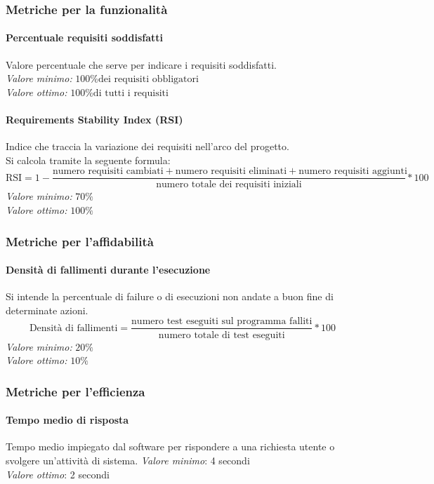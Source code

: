 \subsubsection{Metriche per la funzionalità}
\paragraph{Percentuale requisiti soddisfatti}
Valore percentuale che serve per indicare i requisiti soddisfatti.\\
\textit{Valore minimo:} $100\% \text{dei requisiti obbligatori}$\\
\textit{Valore ottimo:} $100\% \text{di tutti i requisiti}$
\paragraph{Requirements Stability Index (RSI)}
Indice che traccia la variazione dei requisiti nell'arco del progetto.\\
Si calcola tramite la seguente formula:
\begin{equation*}
\text{RSI}=1-\frac{\text{numero requisiti cambiati}+\text{numero requisiti eliminati}+\text{numero requisiti aggiunti}}{\text{numero totale dei requisiti iniziali}}*100
\end{equation*}
\textit{Valore minimo:} $70\%$\\
\textit{Valore ottimo:} $100\%$

\subsubsection{Metriche per l'affidabilità}
\paragraph{Densità di fallimenti durante l'esecuzione}
Si intende la percentuale di failure o di esecuzioni non andate a buon fine di determinate azioni.
\begin{equation*}
\text{Densità di fallimenti}=\frac{\text{numero test eseguiti sul programma falliti}}{\text{numero totale di test eseguiti}}*100
\end{equation*}
\textit{Valore minimo:} $20\%$\\
\textit{Valore ottimo:} $10\%$

\subsubsection{Metriche per l'efficienza}
\paragraph{Tempo medio di risposta}
Tempo medio impiegato dal software per rispondere a una richiesta utente o svolgere un’attività di sistema.
\textit{Valore minimo}: 4 secondi\\
\textit{Valore ottimo}: 2 secondi\\
